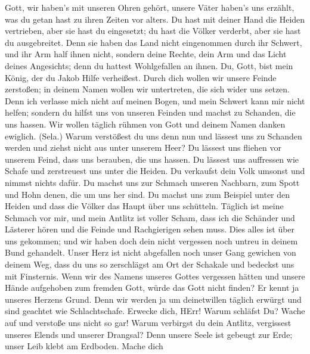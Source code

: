  Gott, wir haben's mit unseren Ohren gehört, unsere Väter
haben's uns erzählt, was du getan hast zu ihren Zeiten vor alters.
 Du hast mit deiner Hand die Heiden vertrieben, aber sie
hast du eingesetzt; du hast die Völker verderbt, aber sie hast du
ausgebreitet.  Denn sie haben das Land nicht eingenommen
durch ihr Schwert, und ihr Arm half ihnen nicht, sondern deine Rechte,
dein Arm und das Licht deines Angesichts; denn du hattest Wohlgefallen
an ihnen.  Du, Gott, bist mein König, der du Jakob Hilfe
verheißest.  Durch dich wollen wir unsere Feinde zerstoßen;
in deinem Namen wollen wir untertreten, die sich wider uns setzen.
 Denn ich verlasse mich nicht auf meinen Bogen, und mein
Schwert kann mir nicht helfen;  sondern du hilfst uns von
unseren Feinden und machst zu Schanden, die uns hassen.  Wir
wollen täglich rühmen von Gott und deinem Namen danken ewiglich. (Sela.)
 Warum verstößest du uns denn nun und lässest uns zu
Schanden werden und ziehst nicht aus unter unserem Heer? 
Du lässest uns fliehen vor unserem Feind, dass uns berauben, die uns
hassen.  Du lässest uns auffressen wie Schafe und
zerstreuest uns unter die Heiden.  Du verkaufst dein Volk
umsonst und nimmst nichts dafür.  Du machst uns zur Schmach
unseren Nachbarn, zum Spott und Hohn denen, die um uns her sind.
 Du machst uns zum Beispiel unter den Heiden und dass die
Völker das Haupt über uns schütteln.  Täglich ist meine
Schmach vor mir, und mein Antlitz ist voller Scham,  dass
ich die Schänder und Lästerer hören und die Feinde und Rachgierigen
sehen muss.  Dies alles ist über uns gekommen; und wir
haben doch dein nicht vergessen noch untreu in deinem Bund gehandelt.
 Unser Herz ist nicht abgefallen noch unser Gang gewichen
von deinem Weg,  dass du uns so zerschlägst am Ort der
Schakale und bedeckst uns mit Finsternis.  Wenn wir des
Namens unseres Gottes vergessen hätten und unsere Hände aufgehoben zum
fremden Gott,  würde das Gott nicht finden? Er kennt ja
unseres Herzens Grund.  Denn wir werden ja um deinetwillen
täglich erwürgt und sind geachtet wie Schlachtschafe. 
Erwecke dich, HErr! Warum schläfst Du? Wache auf und verstoße uns nicht
so gar!  Warum verbirgst du dein Antlitz, vergissest
unseres Elends und unserer Drangsal?  Denn unsere Seele ist
gebeugt zur Erde; unser Leib klebt am Erdboden.  Mache dich
